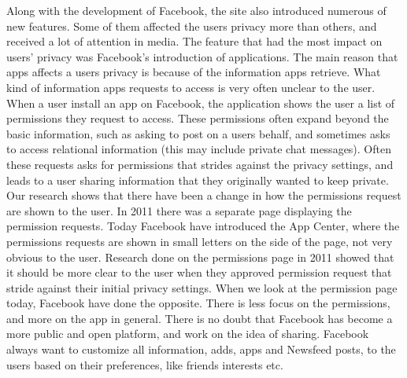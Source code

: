 Along with the development of Facebook, the site also introduced numerous of new features. Some of them affected the users privacy more than others, and received a lot of attention in media. The feature that had the most impact on users' privacy was Facebook's introduction of applications. 
The main reason that apps affects a users privacy is because of the information apps retrieve. What kind of information apps requests to access is very often unclear to the user. When a user install an app on Facebook, the application shows the user a list of permissions they request to access. These permissions often expand beyond the basic information, such as asking to post on a users behalf, and sometimes asks to access relational information (this may include private chat messages). Often these requests asks for permissions that strides against the privacy settings, and leads to a user sharing information that they originally wanted to keep private. Our research shows that there have been a change in how the permissions request are shown to the user. In 2011 there was a separate page displaying the permission requests. Today Facebook have introduced the App Center, where the permissions requests are shown in small letters on the side of the page, not very obvious to the user. Research done on the permissions page in 2011 showed that it should be more clear to the user when they approved permission request that stride against their initial privacy settings. When we look at the permission page today, Facebook have done the opposite. There is less focus on the permissions, and more on the app in general.  
There is no doubt that Facebook has become a more public and open platform, and work on the idea of sharing. Facebook always want to customize all information, adds, apps and Newsfeed posts, to the users based on their preferences, like friends interests etc. 


